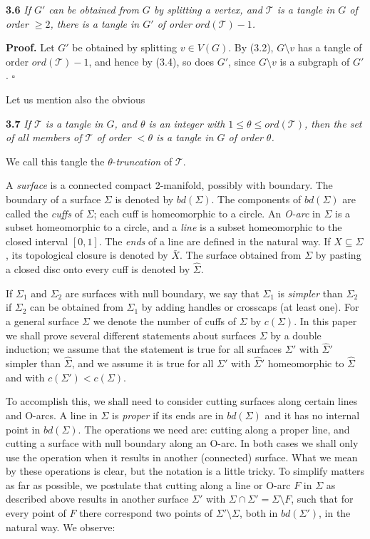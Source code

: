 \textbf{3.6} \textit{If $G'$ can be obtained from $G$ by splitting a vertex, and $\mathcal{T}$ is a tangle in $G$ of order $\ge 2$, there is a tangle in $G'$ of order $ord(\mathcal{T}) - 1$.}

\textbf{Proof.} Let $G'$ be obtained by splitting $v \in V(G)$. By (3.2), $G \setminus v$ has a tangle of order $ord(\mathcal{T}) - 1$, and hence by (3.4), so does $G'$, since $G \setminus v$ is a subgraph of $G'$. $\square$

Let us mention also the obvious

\textbf{3.7} \textit{If $\mathcal{T}$ is a tangle in $G$, and $\theta$ is an integer with $1 \le \theta \le ord(\mathcal{T})$, then the set of all members of $\mathcal{T}$ of order $< \theta$ is a tangle in $G$ of order $\theta$.}

We call this tangle the $\theta$-\textit{truncation} of $\mathcal{T}$.


A \textit{surface} is a connected compact 2-manifold, possibly with boundary. The boundary of a surface $\Sigma$ is denoted by $bd(\Sigma)$. The components of $bd(\Sigma)$ are called the \textit{cuffs} of $\Sigma$; each cuff is homeomorphic to a circle. An \textit{O-arc} in $\Sigma$ is a subset homeomorphic to a circle, and a \textit{line} is a subset homeomorphic to the closed interval $[0, 1]$. The \textit{ends} of a line are defined in the natural way. If $X \subseteq \Sigma$, its topological closure is denoted by $\bar{X}$. The surface obtained from $\Sigma$ by pasting a closed disc onto every cuff is denoted by $\hat{\Sigma}$.

If $\Sigma_1$ and $\Sigma_2$ are surfaces with null boundary, we say that $\Sigma_1$ is \textit{simpler} than $\Sigma_2$ if $\Sigma_2$ can be obtained from $\Sigma_1$ by adding handles or crosscaps (at least one). For a general surface $\Sigma$ we denote the number of cuffs of $\Sigma$ by $c(\Sigma)$. In this paper we shall prove several different statements about surfaces $\Sigma$ by a double induction; we assume that the statement is true for all surfaces $\Sigma'$ with $\hat{\Sigma}'$ simpler than $\hat{\Sigma}$, and we assume it is true for all $\Sigma'$ with $\hat{\Sigma}'$ homeomorphic to $\hat{\Sigma}$ and with $c(\Sigma') < c(\Sigma)$.

To accomplish this, we shall need to consider cutting surfaces along certain lines and O-arcs. A line in $\Sigma$ is \textit{proper} if its ends are in $bd(\Sigma)$ and it has no internal point in $bd(\Sigma)$. The operations we need are: cutting along a proper line, and cutting a surface with null boundary along an O-arc. In both cases we shall only use the operation when it results in another (connected) surface. What we mean by these operations is clear, but the notation is a little tricky. To simplify matters as far as possible, we postulate that cutting along a line or O-arc $F$ in $\Sigma$ as described above results in another surface $\Sigma'$ with $\Sigma \cap \Sigma' = \Sigma \setminus F$, such that for every point of $F$ there correspond two points of $\Sigma' \setminus \Sigma$, both in $bd(\Sigma')$, in the natural way. We observe:
